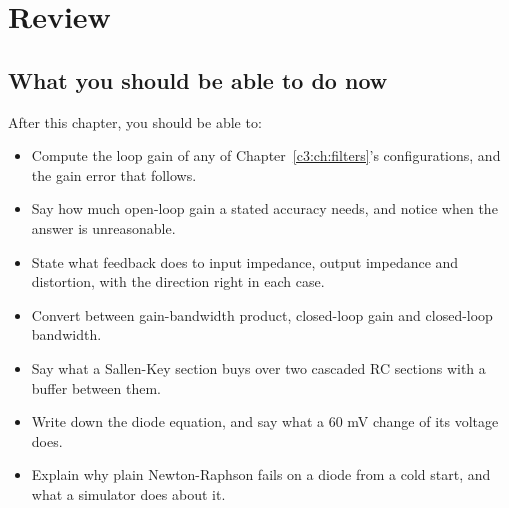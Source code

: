 

\section{Review}
\label{c4:sec:review}

\subsection*{What you should be able to do now}
After this chapter, you should be able to:
\begin{itemize}
  \item Compute the loop gain of any of Chapter~\ref{c3:ch:filters}'s configurations, and the gain error that follows.
  \item Say how much open-loop gain a stated accuracy needs, and notice when the answer is unreasonable.
  \item State what feedback does to input impedance, output impedance and distortion, with the direction right in each case.
  \item Convert between gain-bandwidth product, closed-loop gain and closed-loop bandwidth.
  \item Say what a Sallen-Key section buys over two cascaded RC sections with a buffer between them.
  \item Write down the diode equation, and say what a 60 mV change of its voltage does.
  \item Explain why plain Newton-Raphson fails on a diode from a cold start, and what a simulator does about it.
\end{itemize}

